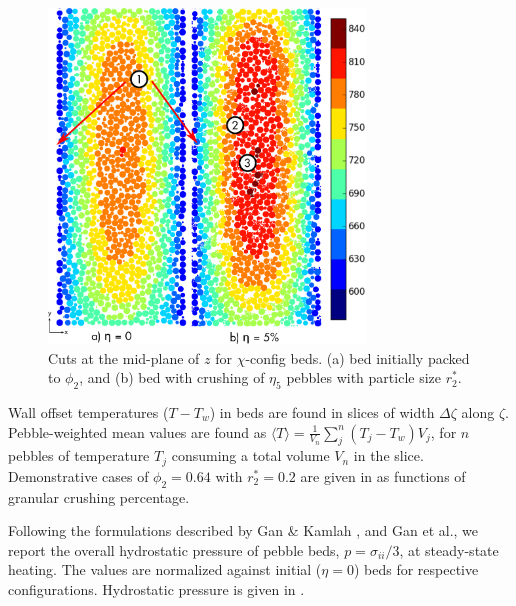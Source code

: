 \begin{figure}[!ht]
    \centering
    \includegraphics[width = 0.75\textwidth]{figures/x-64-discrete.eps}
    \caption{Cuts at the mid-plane of $z$ for $\chi$-config beds. (a) bed initially packed to $\phi_2$, and (b) bed with crushing of $\eta_5$ pebbles with particle size $r_2^*$.}\label{fig:3}
\end{figure}

Wall offset temperatures ($T-T_w$) in beds are found in slices of width $\Delta\zeta$ along $\zeta$. Pebble-weighted mean values are found as $\langle T\rangle = \frac{1}{V_n}\sum_{j}^n (T_j-T_w) V_j$, for $n$ pebbles of temperature $T_j$ consuming a total volume $V_n$ in the slice. Demonstrative cases of $\phi_2 = 0.64$ with $r_2^* = 0.2$ are given in  as functions of granular crushing percentage.

Following the formulations described by Gan \& Kamlah \cite{Gan:2010uq}, and Gan et al.\cite{An20072233}, we report the overall hydrostatic pressure of pebble beds, $p = \sigma_{ii}/3$, at steady-state heating. The values are normalized against initial ($\eta=0$) beds for respective configurations. Hydrostatic pressure is given in .%

